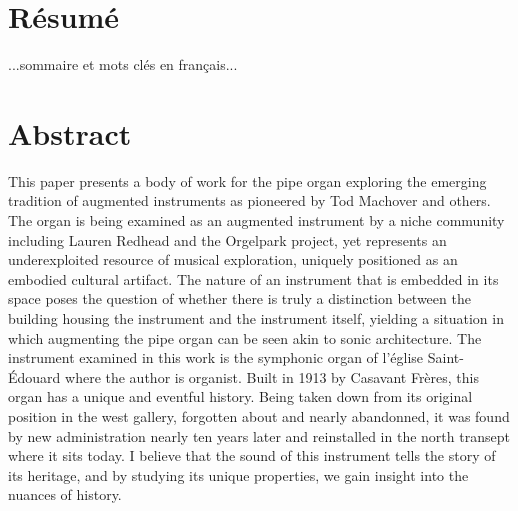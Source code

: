\documentclass[12pt,twoside,maitrise]{dms}
\theoremstyle{definition}
\begin{document}
\maketitle

\maketitle


\francais

\chapter*{Résumé}

...sommaire et mots clés en français...


\anglais

\chapter*{Abstract}

This paper presents a body of work for the pipe organ exploring the emerging tradition of augmented instruments as pioneered by Tod Machover and others. 
The organ is being examined as an augmented instrument by a niche community including Lauren Redhead and the Orgelpark project, yet represents an underexploited resource of musical exploration, uniquely positioned as an embodied cultural artifact. 
The nature of an instrument that is embedded in its space poses the question of whether there is truly a distinction between the building housing the instrument and the instrument itself, yielding a situation in which augmenting the pipe organ can be seen akin to sonic architecture. 
The instrument examined in this work is the symphonic organ of l'église Saint-Édouard where the author is organist. 
Built in 1913 by Casavant Frères, this organ has a unique and eventful history. 
Being taken down from its original position in the west gallery, forgotten about and nearly abandonned, it was found by new administration nearly ten years later and reinstalled in the north transept where it sits today. 
I believe that the sound of this instrument tells the story of its heritage, and by studying its unique properties, we gain insight into the nuances of history. 
\end{document}
